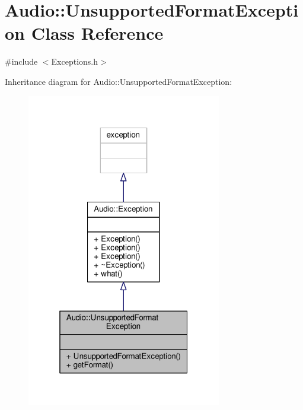 \hypertarget{classAudio_1_1UnsupportedFormatException}{}\section{Audio\+:\+:Unsupported\+Format\+Exception Class Reference}
\label{classAudio_1_1UnsupportedFormatException}


{\ttfamily \#include $<$Exceptions.\+h$>$}



Inheritance diagram for Audio\+:\+:Unsupported\+Format\+Exception\+:
\nopagebreak
\begin{figure}[H]
\begin{center}
\leavevmode
\includegraphics[width=241pt]{df/d47/classAudio_1_1UnsupportedFormatException__inherit__graph}
\end{center}
\end{figure}


